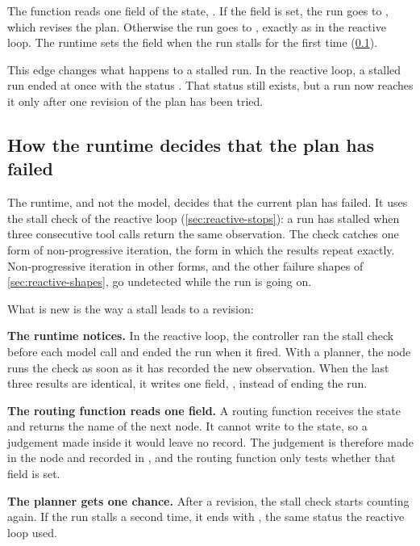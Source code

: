 The function reads one field of the state, . If the field is set, the run goes
to , which revises the plan. Otherwise the run goes to , exactly as
in the reactive loop. The runtime sets the field when the run stalls for the first time
(\cref{sec:planning-stall}).

This edge changes what happens to a stalled run. In the reactive loop, a stalled run ended at once
with the status . That status still exists, but a run now reaches it only after
one revision of the plan has been tried.

\subsection{How the runtime decides that the plan has failed}
\label{sec:planning-stall}

The runtime, and not the model, decides that the current plan has failed. It uses the stall check of
the reactive loop (\cref{sec:reactive-stops}): a run has stalled when three consecutive tool calls
return the same observation. The check catches one form of non-progressive iteration, the form in
which the results repeat exactly. Non-progressive iteration in other forms, and the other failure
shapes of \cref{sec:reactive-shapes}, go undetected while the run is going on.

What is new is the way a stall leads to a revision:
\bi
\item \textbf{The runtime notices.} In the reactive loop, the controller ran the stall check before
each model call and ended the run when it fired. With a planner, the  node runs the
check as soon as it has recorded the new observation. When the last three results are identical, it
writes one field, , instead of ending the run.
\item \textbf{The routing function reads one field.} A routing function receives the state and
returns the name of the next node. It cannot write to the state, so a judgement made inside it would
leave no record. The judgement is therefore made in the  node and recorded in
, and the routing function only tests whether that field is set.
\item \textbf{The planner gets one chance.} After a revision, the stall check starts counting again.
If the run stalls a second time, it ends with , the same status the reactive
loop used.
\ei


